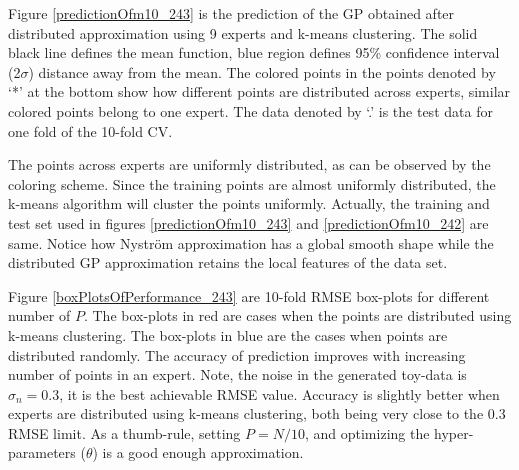 Figure \ref{predictionOfm10_243} is the prediction of the GP obtained after distributed approximation using 9 experts and k-means clustering. The solid black line defines the mean function, blue region defines 95\% confidence interval (2$\sigma$) distance away from the mean. The colored points in the points denoted by `*' at the bottom show how different points are distributed across experts, similar colored points belong to one expert. The data denoted by `.' is the test data for one fold of the 10-fold CV. 

The points across experts are uniformly distributed, as can be observed by the coloring scheme. Since the training points are almost uniformly distributed, the k-means algorithm will cluster the points uniformly. Actually, the training and test set used in figures \ref{predictionOfm10_243} and \ref{predictionOfm10_242} are same. Notice how Nystr\"{o}m approximation has a global smooth shape while the distributed GP approximation retains the local features of the data set. 

Figure \ref{boxPlotsOfPerformance_243} are 10-fold RMSE box-plots for different number of $P$. The box-plots in red are cases when the points are distributed using k-means clustering. The box-plots in blue are the cases when points are distributed randomly. The accuracy of prediction improves with increasing number of points in an expert. Note, the noise in the generated toy-data is $\sigma_{n}=0.3$, it is the best achievable RMSE value. Accuracy is slightly better when experts are distributed using k-means clustering, both being very close to the $0.3$ RMSE limit. As a thumb-rule, setting $P = N/10$, and optimizing the hyper-parameters ($\theta$) is a good enough approximation. 



